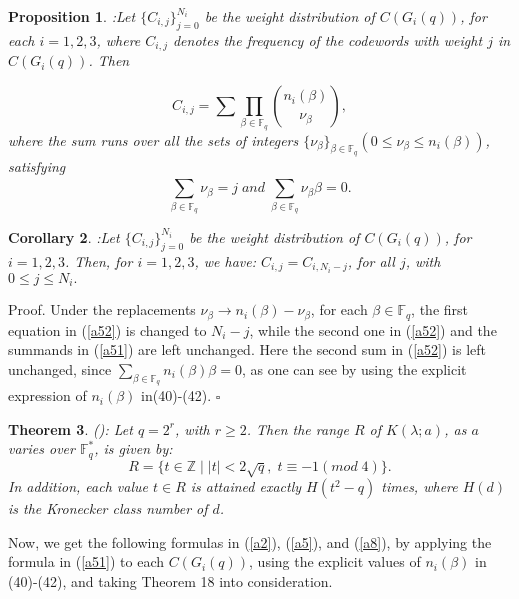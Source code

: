 \documentclass[a4,12pt]{elsart}
\newtheorem{theorem}{Theorem}
\newtheorem{corollary}[theorem]{Corollary}
\newtheorem{proposition}[theorem]{Proposition}
\begin{document}
\begin{proposition}:\label{P}
Let $\{C_{i,j}\}_{j=0}^{N_i}$ be the weight distribution of
$C(G_i(q))$, for each $i=1, 2, 3$, where $C_{i,j}$ denotes the
frequency of the codewords with weight $j$ in $C(G_i(q))$. Then

\begin{equation}\label{a51}
C_{i,j}=\sum  \prod_{ \beta \in {\mathbb{F}}_q} \binom{n_i( \beta )}{
\nu_\beta},
\end{equation}
where the sum runs over all the sets of integers $\{ \nu_\beta \}_{
\beta \in {\mathbb{F}}_q }(0 \leq \nu_\beta \leq n_i(\beta))$, satisfying
\begin{equation}\label{a52}
\sum_{\beta \in {\mathbb{F}}_{q}}^{} \nu_{\beta}=j \; and \; \sum _{\beta \in
{\mathbb{F}}_{q}}^{} \nu_{\beta} \beta =0.
\end{equation}
\end{proposition}

\begin{corollary}:\label{Q}
Let $\{C_{i,j}\}_{j=0}^{N_{i}}$ be the weight distribution of
$C(G_i(q))$, for $i=1, 2,3$. Then,  for $i=1, 2, 3$, we have:
$C_{i,j}=C_{i,N_{i}-j}$, for all $ j$, with
 $0 \leq j \leq N_i.$
\end{corollary}

{{\sc Proof.} \enspace} Under the replacements $\nu_ \beta \rightarrow n_i(\beta
)-\nu_ \beta$, for each $\beta \in {\mathbb{F}}_q$, the first equation in
(\ref{a52}) is changed to $N_i -j$, while the second one in
(\ref{a52}) and the summands in (\ref{a51}) are left unchanged. Here
the second sum in (\ref{a52}) is left unchanged, since $\sum_{\beta
\in {\mathbb{F}}_q}n_i(\beta)\beta=0$, as one can see by using the explicit
expression of $n_i( \beta)$ in(40)-(42).
\qquad \qquad \qquad \qquad \qquad \qquad \qquad \qquad \qquad \qquad \qquad $\square$\\

\begin{theorem}\label{R}(\cite{GJ}):
Let $q=2^r$, with $ r \geq 2$. Then the range $R$ of $K(\lambda ;a)
$, as $a$ varies over ${\mathbb{F}}_q^{*}$, is given by:
\begin{equation*}
R=\{t \in \mathbb{Z} \; | \; |t |<2 \sqrt{q}, \; t\equiv -1 (mod \;
4) \}.
\end{equation*}
In addition, each value $t \in R $ is attained exactly $H(t^2 -q)$
times, where $H(d)$ is the Kronecker class number of $d$.
\end{theorem}

Now, we get the following formulas in (\ref{a2}), (\ref{a5}), and
(\ref{a8}), by applying the formula in (\ref{a51}) to each $
C(G_i(q))$, using the explicit values of $n_i(\beta)$ in (40)-(42),
and taking Theorem 18 into consideration.
\end{document}

